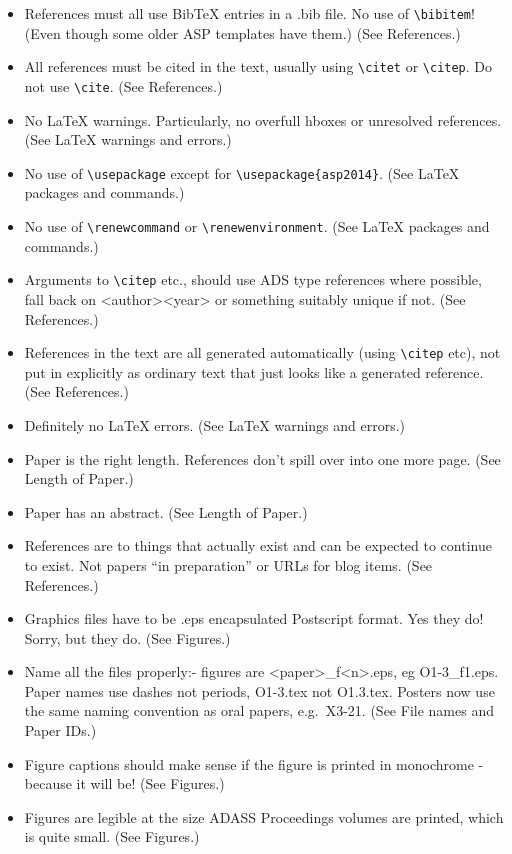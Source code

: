 \documentclass[11pt,twoside]{article}
\begin{document}
\begin{itemize}
\checklistitemize

\item References must all use BibTeX entries in a .bib file. No use of \verb"\bibitem"! (Even though some older ASP templates have them.) (See References.)
\item All references must be cited in the text, usually using \verb"\citet" or \verb"\citep".  Do not use \verb"\cite". (See References.)
\item No LaTeX warnings. Particularly, no overfull hboxes or unresolved references. (See LaTeX warnings and errors.)
\item No use of \verb"\usepackage" except for \verb"\usepackage{asp2014}". (See LaTeX packages and commands.)
\item No use of \verb"\renewcommand" or \verb"\renewenvironment". (See LaTeX packages and commands.)
\item Arguments to \verb"\citep" etc., should use ADS type references where possible, fall back on <author><year> or something suitably unique if not. (See References.)
\item References in the text are all generated automatically (using \verb"\citep" etc), not put in explicitly as ordinary text that just looks like a generated reference. (See References.)
\item Definitely no LaTeX errors. (See LaTeX warnings and errors.)
\item Paper is the right length. References don't spill over into one more page. (See Length of Paper.)
\item Paper has an abstract. (See Length of Paper.)
\item References are to things that actually exist and can be expected to continue to exist. Not papers ``in preparation'' or URLs for blog items. (See References.)
\item Graphics files have to be .eps encapsulated Postscript format. Yes they do! Sorry, but they do. (See Figures.)
\item Name all the files properly:- figures are <paper>\_f<n>.eps, eg O1-3\_f1.eps. Paper names use dashes not periods, O1-3.tex not O1.3.tex. Posters now use the same naming convention as oral papers, e.g.\ X3-21. (See File names and Paper IDs.)
\item Figure captions should make sense if the figure is printed in monochrome - because it will be! (See Figures.)
\item Figures are legible at the size ADASS Proceedings volumes are printed, which is quite small. (See Figures.)

\end{itemize}
\end{document}
